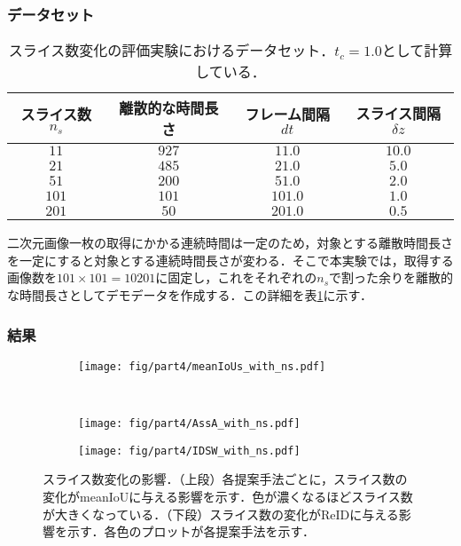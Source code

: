    \subsubsection{データセット}

    \begin{table}[t]
        \centering
        \caption[スライス数変化の評価実験におけるデータセット]{スライス数変化の評価実験におけるデータセット．$t_c = 1.0$として計算している．}
        \label{tab:ns_exp_detail}
        \begin{tabular}{c|ccc}
            スライス数$n_s$ & 離散的な時間長さ & フレーム間隔$dt$ & スライス間隔$\delta z$ 
            \\ \hline \hline
            $11$ & $927$ & $11.0$ & $10.0$
            \\ $21$ & $485$ & $21.0$ & $5.0$
            \\ $51$ & $200$ & $51.0$ & $2.0$
            \\ $101$ & $101$ & $101.0$ & $1.0$
            \\ $201$ & $50$ & $201.0$ & $0.5$
        \end{tabular}
    \end{table}

    二次元画像一枚の取得にかかる連続時間は一定のため，対象とする離散時間長さを一定にすると対象とする連続時間長さが変わる．そこで本実験では，取得する画像数を$101 \times 101 = 10201$に固定し，これをそれぞれの$n_s$で割った余りを離散的な時間長さとしてデモデータを作成する．この詳細を表\ref{tab:ns_exp_detail}に示す．

    \subsubsection{結果}

    \begin{figure}[t]
        \begin{subfigure}[t]{\linewidth}
            \centering
            \texttt{[image: fig/part4/meanIoUs\_with\_ns.pdf]}
        \end{subfigure}
        \\
        \begin{subfigure}[t]{.5\linewidth}
            \centering
            \texttt{[image: fig/part4/AssA\_with\_ns.pdf]}
        \end{subfigure}
        \begin{subfigure}[t]{.5\linewidth}
            \centering
            \texttt{[image: fig/part4/IDSW\_with\_ns.pdf]}
        \end{subfigure}
        \caption[スライス数変化の影響]{スライス数変化の影響．（上段）各提案手法ごとに，スライス数の変化がmeanIoUに与える影響を示す．色が濃くなるほどスライス数が大きくなっている．（下段）スライス数の変化がReIDに与える影響を示す．各色のプロットが各提案手法を示す．}
        \label{fig:ns_effect}
    \end{figure}

